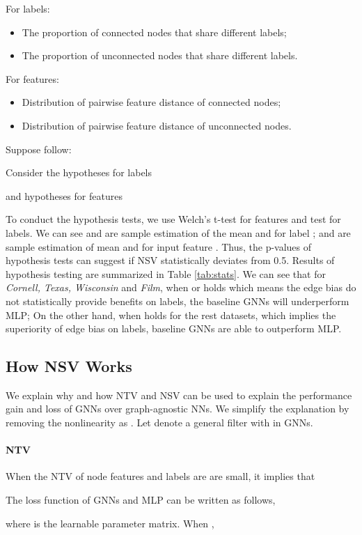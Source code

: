 \documentclass{article}
\newcommand{\0}{{\boldsymbol{0}}}
\newcommand{\6}{{\partial}}
\newcommand{\8}{{\infty}}
\newcommand{\4}{{\nabla}}
\begin{document}
For labels: 
\begin{itemize}
    \item  The proportion of connected nodes that share different labels;
    \item  The proportion of unconnected nodes that share different labels.
\end{itemize}
For features: 
\begin{itemize}
    \item  Distribution of pairwise feature distance of connected nodes;
    \item  Distribution of pairwise feature distance of unconnected nodes.
\end{itemize}
Suppose  follow:

Consider the hypotheses for labels

and hypotheses for features

To conduct the hypothesis tests, we use Welch's t-test for features and  test for labels. We can see  and  are sample estimation of the mean  and  for label ;  and  are sample estimation of mean  and  for input feature . Thus, the p-values of hypothesis tests can suggest if NSV statistically deviates from 0.5.  Results of hypothesis testing are summarized in Table \ref{tab:stats}. We can see that for \textit{Cornell, Texas, Wisconsin} and \textit{Film}, when  or  holds which means the edge bias do not statistically provide benefits on labels, the baseline GNNs will underperform MLP; On the other hand, when  holds for the rest datasets, which implies the superiority of edge bias on labels, baseline GNNs are able to outperform MLP.

\subsection{How NSV Works}
We explain why and how NTV and NSV can be used to explain the performance gain and loss of GNNs over graph-agnostic NNs. We simplify the explanation by removing the nonlinearity as \cite{wu2019simplifying}. Let  denote a general filter with  in GNNs.
\paragraph{NTV} When the NTV of node features  and labels  are are small, it implies that

The loss function of GNNs and MLP can be written as follows,

where  is the learnable parameter matrix. When ,
\end{document}

